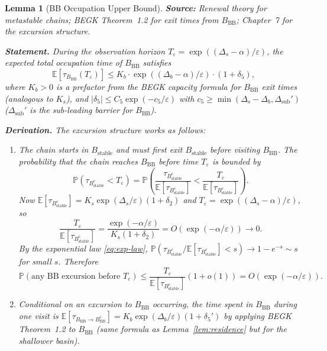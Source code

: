 \documentclass[11pt]{article}
\newtheorem{lemma}{Lemma}
\newcommand{\eps}{\varepsilon}
\newcommand{\Ds}{\Delta_s}
\newcommand{\Db}{\Delta_b}
\newcommand{\Bstable}{B_{\mathrm{stable}}}
\newcommand{\BBB}{B_{\mathrm{BB}}}
\newcommand{\Teps}{T_\eps}
\begin{document}
\begin{lemma}[BB Occupation Upper Bound]\label{lem:bb-upper}
\textbf{Source:} Renewal theory for metastable chains; BEGK
\cite{BEGK02} Theorem~1.2 for exit times from $\BBB$; \cite{BdH15}
Chapter~7 for the excursion structure.

\medskip
\textbf{Statement.}
During the observation horizon $\Teps = \exp((\Ds - \alpha)/\eps)$,
the expected total occupation time of $\BBB$ satisfies
\begin{equation}\label{eq:bb-occupation}
  \mathbb{E}[\tau_\BBB(\Teps)]
  \leq K_b \cdot \exp((\Db - \alpha)/\eps) \cdot (1 + \delta_5),
\end{equation}
where $K_b > 0$ is a prefactor from the BEGK capacity formula for
$\BBB$ exit times (analogous to $K_s$), and
$|\delta_5| \leq C_5 \exp(-c_5/\eps)$ with
$c_5 \geq \min(\Ds - \Db, \Delta_{\mathrm{sub}}')$ ($\Delta_{\mathrm{sub}}'$
is the sub-leading barrier for $\BBB$).

\medskip
\textbf{Derivation.}
The excursion structure works as follows:
\begin{enumerate}
\item The chain starts in $\Bstable$ and must first exit $\Bstable$
  before visiting $\BBB$. The probability that the chain reaches
  $\BBB$ before time $\Teps$ is bounded by
  \[
    \mathbb{P}(\tau_{\Bstable^c} < \Teps)
    = \mathbb{P}\!\left(\frac{\tau_{\Bstable^c}}
      {\mathbb{E}[\tau_{\Bstable^c}]}
      < \frac{\Teps}{\mathbb{E}[\tau_{\Bstable^c}]}\right).
  \]
  Now $\mathbb{E}[\tau_{\Bstable^c}] = K_s \exp(\Ds/\eps)(1+\delta_2)$
  and $\Teps = \exp((\Ds - \alpha)/\eps)$, so
  \[
    \frac{\Teps}{\mathbb{E}[\tau_{\Bstable^c}]}
    = \frac{\exp(-\alpha/\eps)}{K_s(1+\delta_2)}
    = O(\exp(-\alpha/\eps)) \to 0.
  \]
  By the exponential law \eqref{eq:exp-law},
  $\mathbb{P}(\tau_{\Bstable^c}/\mathbb{E}[\tau_{\Bstable^c}] < s)
  \to 1 - e^{-s} \sim s$ for small $s$. Therefore
  \begin{equation}\label{eq:excursion-prob}
    \mathbb{P}(\text{any BB excursion before } \Teps)
    \leq \frac{\Teps}{\mathbb{E}[\tau_{\Bstable^c}]}(1 + o(1))
    = O(\exp(-\alpha/\eps)).
  \end{equation}

\item Conditional on an excursion to $\BBB$ occurring, the time spent
  in $\BBB$ during one visit is
  $\mathbb{E}[\tau_{\BBB \to \BBB^c}] = K_b \exp(\Db/\eps)(1+\delta_5')$
  by applying BEGK Theorem~1.2 to $\BBB$ (same formula as
  Lemma~\ref{lem:residence} but for the shallower basin).


\end{enumerate}
\end{lemma}
\end{document}
